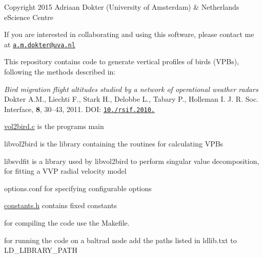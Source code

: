 Copyright 2015 Adriaan Dokter (University of Amsterdam) \& Netherlands e\+Science Centre

If you are interested in collaborating and using this software, please contact me at \href{mailto:a.m.dokter@uva.nl}{\tt a.\+m.\+dokter@uva.\+nl}

This repository contains code to generate vertical profiles of birds (V\+P\+Bs), following the methods described in\+:

{\itshape Bird migration flight altitudes studied by a network of operational weather radars} Dokter A.\+M., Liechti F., Stark H., Delobbe L., Tabary P., Holleman I. J. R. Soc. Interface, {\bfseries 8}, 30–43, 2011. D\+OI\+: \href{https://doi.org/10.1098/rsif.2010.0116}{\tt 10./rsif.2010.}


\begin{DoxyEnumerate}
\item {\ttfamily \mbox{\hyperlink{vol2bird_8c}{vol2bird.\+c}}} is the program\textquotesingle{}s main
\item {\ttfamily libvol2bird} is the library containing the routines for calculating V\+P\+Bs
\item {\ttfamily libsvdfit} is a library used by libvol2bird to perform singular value decomposition, for fitting a V\+VP radial velocity model
\item {\ttfamily options.\+conf} for specifying configurable options
\item {\ttfamily \mbox{\hyperlink{constants_8h_source}{constants.\+h}}} contains fixed constants
\end{DoxyEnumerate}

for compiling the code use the {\ttfamily Makefile}.

for running the code on a baltrad node add the paths listed in {\ttfamily ldlib.\+txt} to {\ttfamily L\+D\+\_\+\+L\+I\+B\+R\+A\+R\+Y\+\_\+\+P\+A\+TH} 